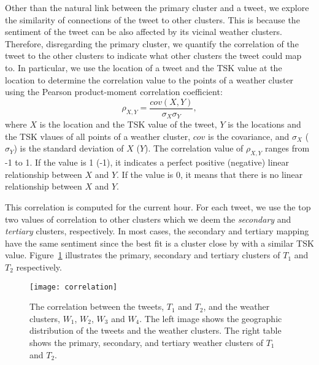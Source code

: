 Other than the natural link between the primary cluster and a tweet, we explore the similarity of connections of the tweet to other clusters. %
This is because the sentiment of the tweet can be also affected by its vicinal weather clusters. Therefore, disregarding the primary cluster, we quantify the correlation of the tweet to the other clusters to indicate what other clusters the tweet could map to. In particular, we use the location of a tweet and the TSK value at the location to determine the correlation value to the points of a weather cluster using the Pearson product-moment correlation coefficient:
\begin{equation}
\label{eq:pearson}
\rho_{X,Y}=\frac{cov(X,Y)}{\sigma_{X}\sigma_{Y}},
\end{equation}
where $X$ is the location and the TSK value of the tweet, $Y$ is the locations and the TSK vlaues of all points of a weather cluster, $cov$ is the covariance, and $\sigma_{X}$ ($\sigma_{Y}$) is the standard deviation of $X$ ($Y$). The correlation value of $\rho_{X,Y}$ ranges from -1 to 1. If the value is 1 (-1), it indicates a perfect positive (negative) linear relationship between $X$ and $Y$. If the value is 0, it means that there is no linear relationship between $X$ and $Y$.

This correlation is computed for the current hour. For each tweet, we use the top two values of correlation to other clusters which we deem the \emph{secondary} and \emph{tertiary} clusters, respectively. In most cases, the secondary and tertiary mapping have the same sentiment since the best fit is a cluster close by with a similar TSK value. Figure~\ref{fig:correlation} illustrates the primary, secondary and tertiary clusters of $T_1$ and $T_2$ respectively.



\begin{figure}[t]
\begin{center}
\texttt{[image: correlation]}
\end{center}
\vspace{-.1in}
\caption{The correlation between the tweets, $T_1$ and $T_2$, and the weather clusters, $W_1$, $W_2$, $W_3$ and $W_4$. The left image shows the geographic distribution of the tweets and the weather clusters. The right table shows the primary, secondary, and tertiary weather clusters of $T_1$ and $T_2$.}
\label{fig:correlation}
\end{figure}

